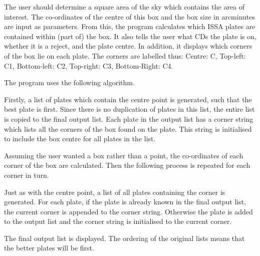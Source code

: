 \documentclass[11pt,nolof,noabs]{starlink}
\begin{document}
\begin{small}
{{      The user should determine a square area of the sky which contains the
      area of interest. The co-ordinates of the centre of this box and
      the box size in arcminutes are input as parameters.
      From this, the program calculates
      which ISSA plates are contained within (part of) the box. It
      also tells the user what CDs the plate is on, whether it is a
      reject, and the plate centre.
      In addition, it displays which corners of the box lie on each plate.
      The corners are labelled thus:
      Centre: C, Top-left: C1, Bottom-left: C2, Top-right: C3,
      Bottom-Right: C4.

      The program uses the following algorithm.

      Firstly, a list of plates which contain the centre point is generated,
      such that the best plate is first. Since there is no duplication of
      plates in this list, the entire list is copied to the final output
      list. Each plate in the output list has a corner string which lists
      all the corners of the box found on the plate. This string is initialised
      to include the box centre for all plates in the list.

      Assuming the user wanted a box rather than a point, the
      co-ordinates of each corner of the box are calculated. Then the
      following process is repeated for each corner in turn.

      Just as with the centre point, a list of all plates containing the
      corner is generated. For each plate, if the plate is already known
      in the final output list, the current corner is appended to the corner
      string. Otherwise the plate is added to the output list and the corner
      string is initialised to the current corner.

      The final output list is displayed. The ordering of the original lists
      means that the better plates will be first.
   }
}


\end{small}
\end{document}
